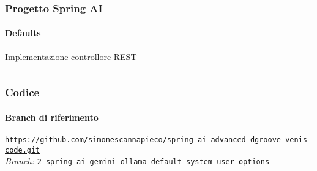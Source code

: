%
\begin{frame}[t,fragile] \frametitle{Progetto Spring AI}
    \framesubtitle{Defaults}
    	\vspace*{-.7cm}
        \begin{block}{Implementazione controllore REST}
			{\tiny\inputminted{java}{code/QuestionController.java}}
    	\end{block}
\end{frame}
%
\begin{frame}[fragile] \frametitle{Codice}
    \framesubtitle{Branch di riferimento}
	\begin{center}
		{\scriptsize \href{https://github.com/simonescannapieco/spring-ai-advanced-dgroove-venis-code.git}{\texttt{https://github.com/simonescannapieco/spring-ai-advanced-dgroove-venis-code.git}}}\\
		\textit{Branch:} \alert{\texttt{2-spring-ai-gemini-ollama-default-system-user-options}}
	\end{center}
\end{frame}